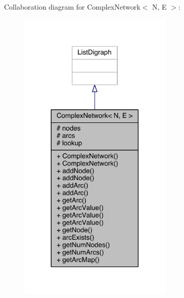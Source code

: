 Collaboration diagram for Complex\+Network$<$ N, E $>$\+:
\nopagebreak
\begin{figure}[H]
\begin{center}
\leavevmode
\includegraphics[width=209pt]{class_complex_network__coll__graph}
\end{center}
\end{figure}



